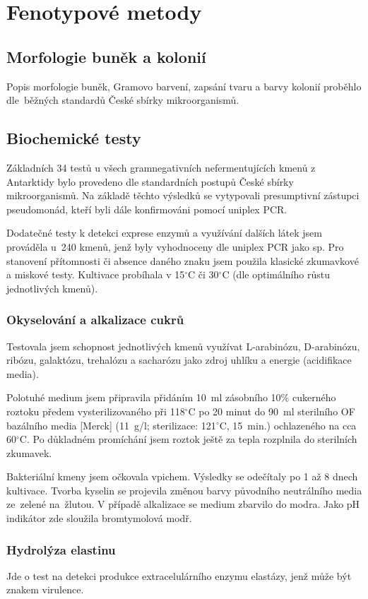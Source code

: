 \section{Fenotypové metody}
\subsection{Morfologie buněk a kolonií}
Popis morfologie buněk, Gramovo barvení, zapsání tvaru a barvy kolonií proběhlo dle~běžných standardů České sbírky mikroorganismů.

\subsection{Biochemické testy}
Základních 34 testů u všech gramnegativních nefermentujících kmenů z Antarktidy bylo provedeno dle standardních postupů České sbírky mikroorganismů.
Na základě těchto výsledků se vytypovali presumptivní zástupci pseudomonád, kteří byli dále konfirmováni pomocí uniplex PCR.

Dodatečné testy k detekci exprese enzymů a využívání dalších látek jsem prováděla u~240 kmenů, jenž byly vyhodnoceny dle uniplex PCR jako  sp.
Pro stanovení přítomnosti či absence daného znaku jsem použila klasické zkumavkové a miskové testy.
Kultivace probíhala v 15$^{\circ}$C či 30$^{\circ}$C (dle optimálního růstu jednotlivých kmenů).

\subsubsection{Okyselování a alkalizace cukrů}
Testovala jsem schopnost jednotlivých kmenů využívat L-arabinózu, D-arabinózu, ribózu, galaktózu, trehalózu a sacharózu jako zdroj uhlíku a energie (acidifikace media).

Polotuhé medium jsem připravila přidáním 10~ml zásobního 10\% cukerného roztoku předem vysterilizovaného při 118$^{\circ}$C po 20 minut do 90~ml sterilního OF bazálního media [Merck] (11~g/l; sterilizace: 121$^{\circ}$C, 15~min.) ochlazeného na cca 60$^{\circ}$C.
Po důkladném promíchání jsem roztok ještě za tepla rozplnila do sterilních zkumavek.

Bakteriální kmeny jsem očkovala vpichem.
Výsledky se odečítaly po 1 až 8 dnech kultivace.
Tvorba kyselin se projevila změnou barvy původního neutrálního media ze~zelené na~žlutou.
V případě alkalizace se medium zbarvilo do modra.
Jako pH indikátor zde sloužila bromtymolová modř.

\subsubsection{Hydrolýza elastinu}
Jde o test na detekci produkce extracelulárního enzymu elastázy, jenž může být znakem virulence.

